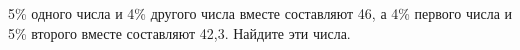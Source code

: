\begin{ex}
	\begin{condition}
		5\% одного числа и 4\% другого числа вместе составляют 46, а 4\% первого числа и 5\% второго вместе составляют 42,3. Найдите эти числа.
	\end{condition}
\end{ex}
